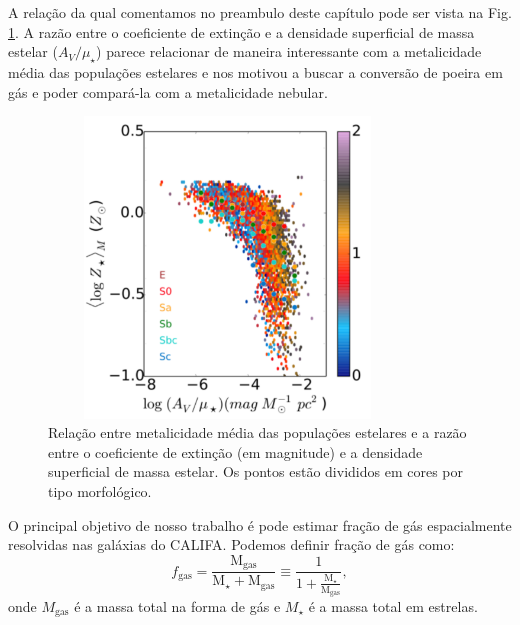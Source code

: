 A relação da qual comentamos no preambulo deste capítulo pode ser vista na Fig.
\ref{fig:dust2stars}. A razão entre o coeficiente de extinção e a densidade superficial de massa
estelar ($A_V / \mu_\star$) parece relacionar de maneira interessante com a metalicidade média das
populações estelares e nos motivou a buscar a conversão de poeira em gás e poder compará-la com a
metalicidade nebular.
\begin{figure}
	\centering
	\includegraphics[height = 8cm, width = 9.5cm]{figuras/dust2stars.pdf}
	\caption[$A_V / \mu_\star$ vs. ]
	{Relação entre metalicidade média das populações estelares e a razão entre o coeficiente de
extinção (em magnitude) e a densidade superficial de massa estelar. Os pontos estão divididos em
cores por tipo morfológico.}
	\label{fig:dust2stars}
\end{figure}
O principal objetivo de nosso trabalho é pode estimar fração de gás espacialmente resolvidas nas
galáxias do CALIFA. Podemos definir fração de gás como:
\begin{equation}
	f_{\mathrm{gas}} = \frac{\mathrm{M}_{\mathrm{gas}}}{\mathrm{M}_\star + \mathrm{M}_{\mathrm{gas}}}
\equiv \frac{1}{1 + \frac{\mathrm{M}_\star}{\mathrm{M}_{\mathrm{gas}}}},
	\label{eq:fgas}
\end{equation}
\noindent onde $M_{\mathrm{gas}}$ é a massa total na forma de gás e $M_\star$ é a massa total em
estrelas. 

